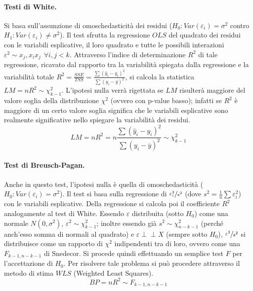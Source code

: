 \documentclass[a4page, 11pt]{article} %
\def\indep{\perp \!\!\! \perp }   %
\begin{document}
\paragraph{Testi di White. } Si basa sull’assunzione di omoschedasticità dei residui ($H_0: Var(\varepsilon_i) = \sigma^2$ contro $H_1: Var(\varepsilon_i) \neq \sigma^2$). %
Il test sfrutta la regressione $OLS$ del quadrato dei residui con le variabili esplicative, il loro quadrato e tutte le possibili interazioni $\varepsilon^2 \sim x_j, x_ix_j \hspace{5pt} \forall i, j < k$. %
Attraverso l'indice di determinazione $R^2$ di tale regressione, ricavato dal rapporto tra la variabilità spiegata dalla regressione e la variabilità totale $R^2 = \frac{SSE}{TSS} = \frac{\sum(\hat{y}_i - y_i)^2}{\sum(y_i - \overline{y})^2}$, si calcola la statistica $LM = n R^2 \sim \chi^2_{k-1}$.
L’ipotesi nulla verrà rigettata se $LM$ risulterà maggiore del valore soglia della distribuzione $\chi^2$ (ovvero con p-value basso);
infatti se $R^2$ è maggiore di un certo valore soglia significa che le variabili esplicative sono realmente significative nello spiegare la variabilità dei residui.
\begin{equation*}
  LM = nR^2 = n\frac{\sum(\hat{y}_i - y_i)^2}{\sum(y_i - \overline{y})^2} \sim \chi^2_{k-1}
\end{equation*}

\paragraph{Test di Breusch-Pagan.} Anche in questo test, l’ipotesi nulla è quella di omoschedasticità ($H_0: Var(\varepsilon_i) = \sigma^2$).
Il test si basa sulla regressione di $\sfrac{\varepsilon^2_i}{s^2}$ (dove $s^2 = \frac{1}{n}\sum{\varepsilon_i^2}$) con le variabili esplicative.
Della regressione si calcola poi il coefficiente $R^2$ analogamente al test di White.
Essendo  $\varepsilon$ distribuita (sotto $H_0$) come una normale $N(0, \sigma^2)$, $\varepsilon^2 \sim \chi^2_{k-1}$; inoltre essendo già $s^2 \sim \chi^2_{n-k-1}$ (perché anch'esso somma di normali al quadrato) e $\varepsilon \indep X$ (sempre sotto $H_0$), $\sfrac{\varepsilon^2}{s^2}$ si distribuisce come un rapporto di $\chi^2$ indipendenti tra di loro, ovvero come una $F_{k-1, n-k-1}$ di Snedecor.
Si procede quindi effettuando un semplice test $F$ per l'accettazione di $H_0$.
Per risolvere tale problema si può procedere attraverso il metodo di stima $WLS$ (Weighted Least Squares).
\begin{equation*}
  BP = nR^2 \sim F_{k-1, n-k-1}
\end{equation*}
\end{document}
